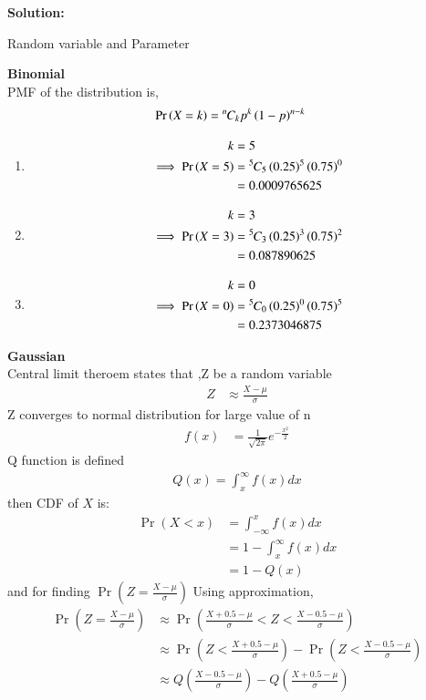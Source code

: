 \documentclass[journal,11pt,onecolumn]{IEEEtran}
\providecommand{\pr}[1]{\ensuremath{\Pr\left(#1\right)}}
\providecommand{\qfunc}[1]{\ensuremath{Q\left(#1\right)}}
\providecommand{\brak}[1]{\ensuremath{\left(#1\right)}}
\newcommand{\solution}{\noindent \textbf{Solution: }}
\providecommand{\pr}[1]{\ensuremath{\Pr\left(#1\right)}}
\providecommand{\qfunc}[1]{\ensuremath{Q\left(#1\right)}}
\newcommand*{\permcomb}[4][0mu]{{{}^{#3}\mkern#1#2_{#4}}}
\newcommand*{\comb}[1][-1mu]{\permcomb[#1]{C}}
\providecommand{\qfunc}[1]{\ensuremath{Q\left(#1\right)}}
\begin{document}
\solution\\
\begin{table}[ht!]
	\centering
	
	\caption{Random variable and Parameter}
	\label{tab:gausstab2_9.3.3}
\end{table}
\textbf{Binomial}\\
PMF of the distribution is,
\begin{align}
	\pr{X=k}&=\comb{n}{k}p^k\brak{1-p}^{n-k}
\end{align}
\begin{enumerate}
	\item
	\begin{align}
	k&=5\\
	\implies \pr{X=5}&=\comb{5}{5}\brak{0.25}^5\brak{0.75}^0\\
	&=0.0009765625
\end{align}
	\item
	\begin{align}
	k&=3\\
	\implies\pr{X=3}&=\comb{5}{3}\brak{0.25}^3\brak{0.75}^2\\
	&=0.087890625
\end{align}
	\item
	\begin{align}
	k&=0\\
	\implies\pr{X=0}&=\comb{5}{0}\brak{0.25}^0\brak{0.75}^5\\
	&=0.2373046875
\end{align}
\end{enumerate}
\textbf{Gaussian}\\
Central limit theroem states that ,Z be a random variable
\begin{align}
	Z&\approx\frac{X- \mu}{\sigma}
\end{align}
Z converges to normal distribution for large value of n
\begin{align}
	f\brak{x}&=\frac{1}{\sqrt{2\pi}}e^{-\frac{x^2}{2}}
\end{align}
Q function is defined
\begin{align}
	\qfunc{x}=\int_x^{\infty}f\brak{x}dx
\end{align}
then CDF of $X$ is:
\begin{align}
	\pr{X<x}&=\int_{-\infty}^x f\brak{x} dx\\
	&=1-\int_x^{\infty}f\brak{x}dx\\
	&=1-\qfunc{x}
\end{align}
and for finding \pr{Z=\frac{X-\mu}{\sigma}} Using approximation,
\begin{align}
	\pr{Z=\frac{X-\mu}{\sigma}} &\approx \pr{\frac{X+0.5-\mu}{\sigma} < Z < \frac{X-0.5-\mu}{\sigma}}\\
	&\approx \pr{Z<\frac{X+0.5-\mu}{\sigma}} - \pr{Z<\frac{X-0.5-\mu}{\sigma}}\\
	&\approx \qfunc{\frac{X-0.5-\mu}{\sigma}} - \qfunc{\frac{X+0.5-\mu}{\sigma}}
\end{align}
\end{document}
